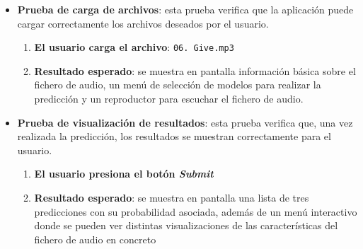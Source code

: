 \begin{itemize}
\tightlist

\item \textbf{Prueba de carga de archivos}: esta prueba verifica que la aplicación puede cargar correctamente los archivos deseados por el usuario.
	\begin{enumerate}
	\tightlist

	\item \textbf{El usuario carga el archivo}: \texttt{06. Give.mp3}
	\item \textbf{Resultado esperado}: se muestra en pantalla información básica sobre el fichero de audio, un menú de selección de modelos para realizar la predicción y un reproductor para escuchar el fichero de audio.

	\end{enumerate}
\item \textbf{Prueba de visualización de resultados}: esta prueba verifica que, una vez realizada la predicción, los resultados se muestran correctamente para el usuario.
	\begin{enumerate}
	\tightlist

	\item \textbf{El usuario presiona el botón \textit{Submit}}
	\item \textbf{Resultado esperado}: se muestra en pantalla una lista de tres predicciones con su probabilidad asociada, además de un menú interactivo donde se pueden ver distintas visualizaciones de las características del fichero de audio en concreto

	\end{enumerate}
\end{itemize}